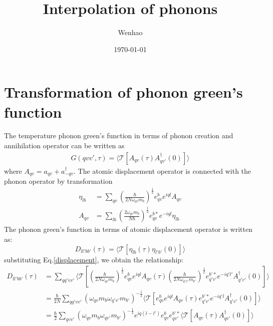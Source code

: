 \documentclass{article}
\begin{document}
\title{Interpolation of phonons}
\author{Wenhao}
\date{\today}
\maketitle

\section{Transformation of phonon green's function}
The temperature phonon green's function in terms of 
phonon creation and annihilation operator can be written as
\begin{align}
    G(qvv',\tau) = \langle \mathcal{T}[A_{qv}(\tau)A_{qv'}^{\dagger}(0)] \rangle \label{green_A}
\end{align}
where $A_{qv} = a_{qv} + a^{\dagger}_{-qv}$. The atomic displacement operator 
is connected with the phonon operator by transformation
\begin{align}
    \eta_{lb} &= \sum_{qv} \left(\frac{\hbar}{2N\omega_{qv}m_b}\right)^{\frac{1}{2}} 
        e_{qv}^b e^{iql} A_{qv} \label{displacement} \\
    A_{qv} &= \sum_{lb} \left( \frac{2\omega_{qv} m_b}{N\hbar} \right)^{\frac{1}{2}}
        e_{qv}^{b*} e^{-iql} \eta_{lb}
\end{align}
The phonon green's function in terms of atomic displacement operator is 
written as:
\begin{equation}
    D_{ll'bb'}(\tau) =  \langle \mathcal{T}[\eta_{lb}(\tau)\eta_{l'b'}(0)] \rangle
\end{equation}
substituting Eq.\ref{displacement}, we obtain the relationship:
\begin{align}
    D_{ll'bb'}(\tau) &= \sum_{qq'vv'} \langle \mathcal{T}[
        \left(\frac{\hbar}{2N\omega_{qv}m_b}\right)^{\frac{1}{2}} 
        e_{qv}^b e^{iql} A_{qv}(\tau)
         \left(\frac{\hbar}{2N\omega_{q'v'}m_{b'}}\right)^{\frac{1}{2}} 
        e_{q'v'}^{b'*} e^{-iq'l'} A_{q'v'}^{\dagger}(0)] \rangle \\
        &= \frac{\hbar}{2N}\sum_{qq'vv'} (\omega_{qv}m_b\omega_{q'v'}m_{b'})^{-\frac{1}{2}} 
        \langle \mathcal{T}[
            e_{qv}^b e^{iql} A_{qv}(\tau)
            e_{q'v'}^{b'*} e^{-iq'l} A_{q'v'}^{\dagger}(0)] \rangle \\
        & = \frac{\hbar}{2}\sum_{qvv'} (\omega_{qv}m_b\omega_{qv'}m_{b'})^{-\frac{1}{2}} 
            e^{iq(l-l')} e_{qv}^b e_{qv'}^{b'*}
            \langle \mathcal{T}[A_{qv}(\tau) A_{qv'}^{\dagger}(0)] \rangle \\
\end{align}
\end{document}
